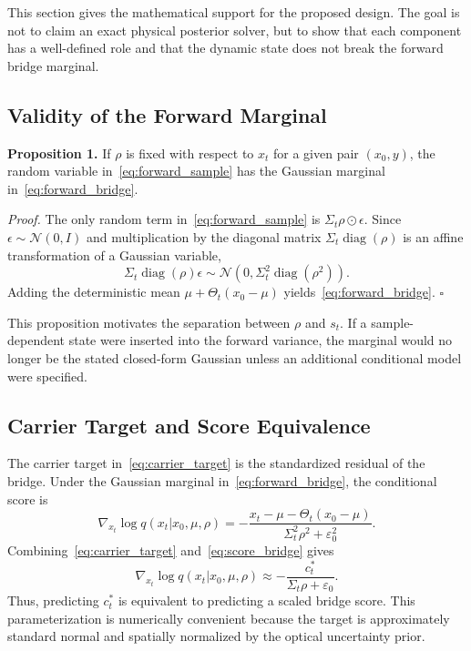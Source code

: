 \documentclass[journal]{IEEEtran}
\newcommand{\N}{\mathcal{N}}
\newcommand{\diag}{\operatorname{diag}}
\newcommand{\eps}{\varepsilon}
\begin{document}
This section gives the mathematical support for the proposed design. The goal is not to claim an exact physical posterior solver, but to show that each component has a well-defined role and that the dynamic state does not break the forward bridge marginal.

\subsection{Validity of the Forward Marginal}
\textbf{Proposition 1.} If $\rho$ is fixed with respect to $x_t$ for a given pair $(x_0,y)$, the random variable in~\eqref{eq:forward_sample} has the Gaussian marginal in~\eqref{eq:forward_bridge}.

\emph{Proof.} The only random term in~\eqref{eq:forward_sample} is $\Sigma_t\rho\odot\epsilon$. Since $\epsilon\sim\N(0,I)$ and multiplication by the diagonal matrix $\Sigma_t\diag(\rho)$ is an affine transformation of a Gaussian variable,
\begin{equation}
    \Sigma_t\diag(\rho)\epsilon \sim \N\left(0,\Sigma_t^2\diag(\rho^2)\right).
\end{equation}
Adding the deterministic mean $\mu+\Theta_t(x_0-\mu)$ yields~\eqref{eq:forward_bridge}. \hfill$\square$

This proposition motivates the separation between $\rho$ and $s_t$. If a sample-dependent state were inserted into the forward variance, the marginal would no longer be the stated closed-form Gaussian unless an additional conditional model were specified.

\subsection{Carrier Target and Score Equivalence}
The carrier target in~\eqref{eq:carrier_target} is the standardized residual of the bridge. Under the Gaussian marginal in~\eqref{eq:forward_bridge}, the conditional score is
\begin{equation}
    \nabla_{x_t}\log q(x_t|x_0,\mu,\rho)
    =-\frac{x_t-\mu-\Theta_t(x_0-\mu)}{\Sigma_t^2\rho^2+\eps_0^2}.
    \label{eq:score_bridge}
\end{equation}
Combining~\eqref{eq:carrier_target} and~\eqref{eq:score_bridge} gives
\begin{equation}
    \nabla_{x_t}\log q(x_t|x_0,\mu,\rho)
    \approx -\frac{c_t^*}{\Sigma_t\rho+\eps_0}.
\end{equation}
Thus, predicting $c_t^*$ is equivalent to predicting a scaled bridge score. This parameterization is numerically convenient because the target is approximately standard normal and spatially normalized by the optical uncertainty prior.
\end{document}
